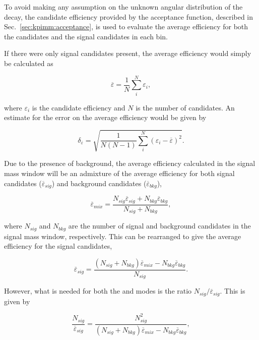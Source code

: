 To avoid making any assumption on the unknown angular distribution of the \BdToKpimm decay, the candidate efficiency provided by the acceptance function, described in Sec.~\ref{sec:kpimm:acceptance}, is used to evaluate the average efficiency for both the \BdToJPsiKst candidates and the signal candidates in each \qsq bin.
 
If there were only signal candidates present, the average efficiency would simply be calculated as

\begin{equation}
\overline{\varepsilon} = \frac{1}{N}\sum\limits_{i}^{N}\varepsilon_{i},
\label{eqn:average_eff}
\end{equation}
 
\noindent where $\varepsilon_{i}$ is the candidate efficiency and $N$ is the number of candidates.  An estimate for the error on the average efficiency would be given by
 
\begin{equation}
\delta_{\overline{\varepsilon}} = \sqrt{\frac{1}{N(N-1)}\sum\limits_{i}^{N}(\varepsilon_{i}-\overline{\varepsilon})^{2}}.
\end{equation}
 
\noindent Due to the presence of background, the average efficiency calculated in the signal mass window will be an admixture of the average efficiency for both signal candidates ($\overline{\varepsilon}_{sig}$) and background candidates ($\overline{\varepsilon}_{bkg}$),
 
\begin{equation}
\overline{\varepsilon}_{mix} = \frac{N_{sig}\overline{\varepsilon}_{sig} + N_{bkg}\overline{\varepsilon}_{bkg}}{N_{sig}+N_{bkg}},
\end{equation}
 
\noindent where $N_{sig}$ and $N_{bkg}$ are the number of signal and background candidates in the signal mass window, respectively. This can be rearranged to give the average efficiency for the signal candidates,
 
\begin{equation}
\overline{\varepsilon}_{sig} = \frac{(N_{sig}+N_{bkg})\overline{\varepsilon}_{mix} -  N_{bkg}\overline{\varepsilon}_{bkg}}{N_{sig}}.
\end{equation}
 
\noindent However, what is needed for both the \BdToKpimm and \BdToJPsiKst modes is the ratio $N_{sig}/\overline{\varepsilon}_{sig}$.  This is given by
 
\begin{equation}
\frac{N_{sig}}{\overline{\varepsilon}_{sig}} = \frac{N_{sig}^{2}}{(N_{sig}+N_{bkg})\overline{\varepsilon}_{mix} -  N_{bkg}\overline{\varepsilon}_{bkg}},
\end{equation}
 
